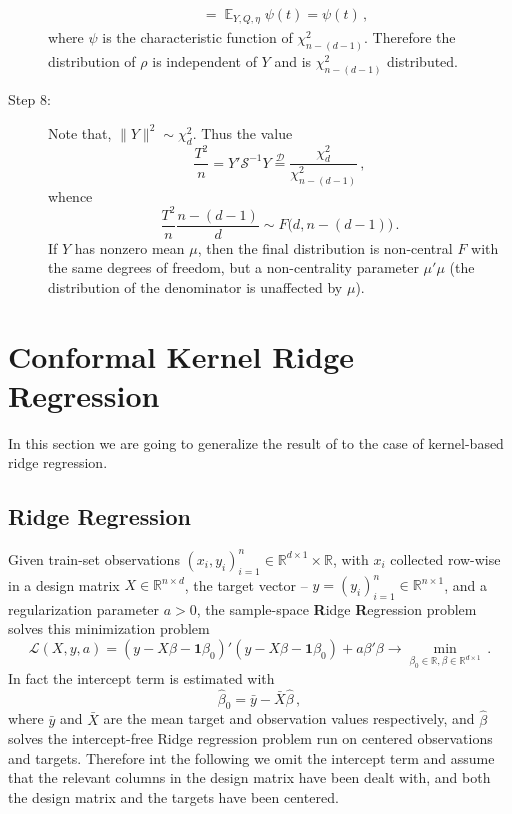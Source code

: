 \documentclass[a4paper,14pt]{article}
\newcommand{\ex}{\mathop{\mathbb{E}}\nolimits}
\newcommand{\one}{\mathbf{1}}
\newcommand{\Scal}{\mathcal{S}}
\newcommand{\Lcal}{\mathcal{L}}
\newcommand{\Real}{\mathbb{R}}
\begin{document}
\begin{description}
\begin{align*}
            &= \ex_{Y, Q, \eta} \psi(t)
            = \psi(t)
            \,,
    \end{align*}
    where $\psi$ is the characteristic function of $\chi^2_{n - (d-1)}$. Therefore
    the distribution of $\rho$ is independent of $Y$ and is $\chi^2_{n - (d-1)}$
    distributed.
    \item[Step 8:] Note that, $\|Y\|^2 \sim \chi^2_d$. Thus the value
    $$ \frac{T^2}{n}
        = Y' \Scal^{-1} Y
        \overset{\mathcal{D}}{=} \frac{\chi^2_d}{\chi^2_{n-(d-1)}}
        \,, $$
    whence
    $$ \frac{T^2}{n}\frac{n-(d-1)}{d} \sim F\bigl(d, n-(d-1)\bigr) \,. $$
    If $Y$ has nonzero mean $\mu$, then the final distribution is non-central $F$
    with the same degrees of freedom, but a non-centrality parameter $\mu' \mu$
    (the distribution of the denominator is unaffected by $\mu$).
\end{description}


\section{Conformal Kernel Ridge Regression} %
\label{sec:conformal_kernel_ridge_regression}

In this section we are going to generalize the result of \cite{BurVovk2014} to
the case of kernel-based ridge regression.

\subsection{Ridge Regression} %
\label{sub:ridge_regression}

Given train-set observations $(x_i, y_i)_{i=1}^n \in \Real^{d\times 1}\times \Real$,
with $x_i$ collected row-wise in a design matrix $X\in \Real^{n\times d}$, the target
vector -- $y=(y_i)_{i=1}^n \in \Real^{n\times 1}$, and a regularization parameter
$a > 0$, the sample-space \textbf{R}idge \textbf{R}egression problem solves this
minimization problem
$$ \Lcal(X, y, a)
  = (y - X\beta - \one\beta_0)'(y - X\beta - \one\beta_0) + a\beta'\beta
    \to \min_{\beta_0\in \Real, \beta\in\Real^{d\times 1}}
  \,. $$
In fact the intercept term is estimated with
$$ \hat{\beta}_0 = \bar{y} - \bar{X} \hat{\beta} \,, $$
where $\bar{y}$ and $\bar{X}$ are the mean target and observation values respectively,
and $\hat{\beta}$ solves the intercept-free Ridge regression problem run on centered
observations and targets. Therefore int the following we omit the intercept term and
assume that the relevant columns in the design matrix have been dealt with, and both
the design matrix and the targets have been centered.
\end{document}
